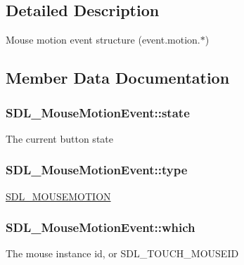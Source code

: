 \subsection{Detailed Description}
Mouse motion event structure (event.\+motion.$\ast$) 

\subsection{Member Data Documentation}
\hypertarget{struct_s_d_l___mouse_motion_event_a3f6e9bad9d959b824881ba09e05b7024}{}
\subsubsection[{state}]{ S\+D\+L\+\_\+\+Mouse\+Motion\+Event\+::state}\label{struct_s_d_l___mouse_motion_event_a3f6e9bad9d959b824881ba09e05b7024}
The current button state \hypertarget{struct_s_d_l___mouse_motion_event_a431dd28cd6db6a7335cf633dbeb80cfb}{}
\subsubsection[{type}]{ S\+D\+L\+\_\+\+Mouse\+Motion\+Event\+::type}\label{struct_s_d_l___mouse_motion_event_a431dd28cd6db6a7335cf633dbeb80cfb}
\hyperlink{_s_d_l__events_8h_a3b589e89be6b35c02e0dd34a55f3fccaa04c436ef80fef38fb77a89e0e9124c30}{S\+D\+L\+\_\+\+M\+O\+U\+S\+E\+M\+O\+T\+I\+O\+N} \hypertarget{struct_s_d_l___mouse_motion_event_a6f04c17b4305683915e2fd2dc3c36dbc}{}
\subsubsection[{which}]{ S\+D\+L\+\_\+\+Mouse\+Motion\+Event\+::which}\label{struct_s_d_l___mouse_motion_event_a6f04c17b4305683915e2fd2dc3c36dbc}
The mouse instance id, or S\+D\+L\+\_\+\+T\+O\+U\+C\+H\+\_\+\+M\+O\+U\+S\+E\+I\+D \hypertarget{struct_s_d_l___mouse_motion_event_aa9976725242ada93a9e18e7fdf5796e6}{}
